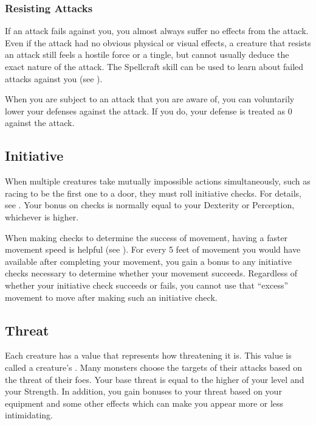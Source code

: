         \subsubsection{Resisting Attacks}
            If an attack fails against you, you almost always suffer no effects from the attack.
            Even if the attack had no obvious physical or visual effects, a creature that resists an attack still feels a hostile force or a tingle, but cannot usually deduce the exact nature of the attack.
            The Spellcraft skill can be used to learn about failed  attacks against you (see ).

             When you are subject to an attack that you are aware of, you can voluntarily lower your defenses against the attack.
            If you do, your defense is treated as 0 against the attack.

    \subsection{Initiative}\label{Initiative}
        When multiple creatures take mutually impossible actions simultaneously, such as racing to be the first one to a door, they must roll initiative checks.
        For details, see .
        Your bonus on  checks is normally equal to your Dexterity or Perception, whichever is higher.

        \label{Movement-Based Initiative}
        When making  checks to determine the success of movement, having a faster movement speed is helpful (see ).
        For every 5 feet of movement you would have available after completing your movement, you gain a  bonus to any initiative checks necessary to determine whether your movement succeeds.
        Regardless of whether your initiative check succeeds or fails, you cannot use that ``excess'' movement to move after making such an initiative check.

    \subsection{Threat}\label{Threat}
        Each creature has a value that represents how threatening it is.
        This value is called a creature's .
        Many monsters choose the targets of their attacks based on the threat of their foes.
        Your base threat is equal to the higher of your level and your Strength.
        In addition, you gain bonuses to your threat based on your equipment and some other effects which can make you appear more or less intimidating.

